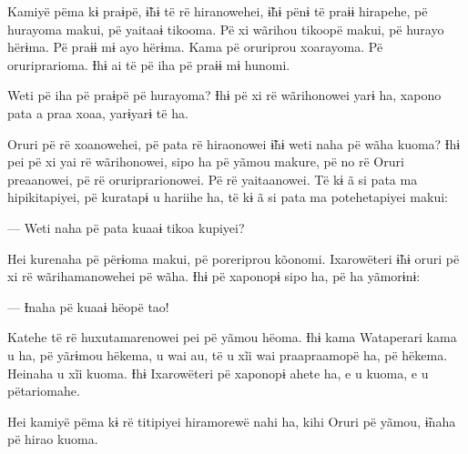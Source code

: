 Kamiyë pëma kɨ praɨpë, ɨ̃hɨ të rë hiranowehei, ɨ̃hɨ pënɨ të praɨɨ
hirapehe, pë hurayoma makui, pë yaitaaɨ tikooma. Pë xi wãrihou tikoopë
makui, pë hurayo hërɨma. Pë praɨɨ mɨ ayo hërɨma. Kama pë oruriprou
xoarayoma. Pë oruriprarioma. Ɨhɨ ai të pë iha pë praɨɨ mɨ hunomi. 

Weti pë iha pë praɨpë pë hurayoma? Ɨhɨ pë xi rë wãrihonowei yarɨ ha,
xapono pata a praa xoaa, yarɨyarɨ të ha. 

Oruri pë rë xoanowehei, pë pata rë hiraonowei ɨ̃hɨ weti naha pë wãha
kuoma? Ɨhɨ pei pë xi yai rë wãrihonowei, sipo ha pë yãmou makure, pë no
rë Oruri preaanowei, pë rë oruriprarionowei. Pë rë yaitaanowei. Të kɨ ã
si pata ma hipikitapiyei, pë kuratapɨ u hariihe ha, të kɨ ã si pata ma
potehetapiyei makui: 

--- Weti naha pë pata kuaaɨ tikoa kupiyei?


Hei kurenaha pë përɨoma makui, pë poreriprou kõonomi. Ixarowëteri ɨ̃hɨ
oruri pë xi rë wãrihamanowehei pë wãha. Ɨhɨ pë xaponopɨ sipo ha, pë ha
yãmorɨnɨ: 

--- Ɨnaha pë kuaaɨ hëopë tao! 


Katehe të rë huxutamarenowei pei pë yãmou hëoma. Ɨhɨ kama Wataperari
kama u ha, pë yãrɨmou hëkema, u wai au, të u xĩi wai praapraamopë ha, pë
hëkema. Heinaha u xĩi kuoma. Ɨhɨ Ixarowëteri pë xaponopɨ ahete ha, e u
kuoma, e u pëtariomahe. 

Hei kamiyë pëma kɨ rë titipiyei hiramorewë nahi ha, kihi Oruri pë yãmou,
ɨ̃naha pë hirao kuoma. 


